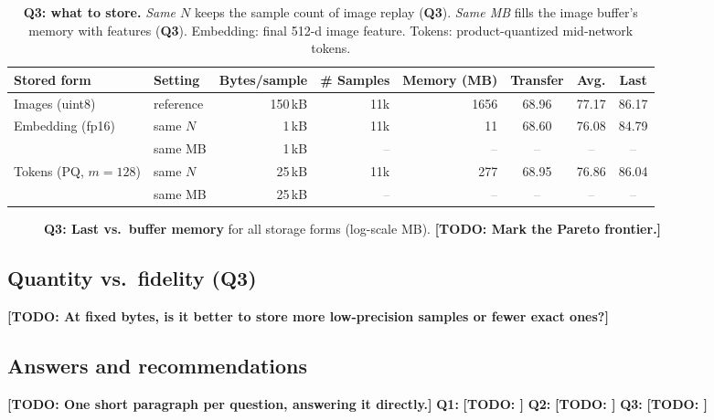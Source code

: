 \documentclass[10pt,twocolumn,letterpaper]{article}
\newcommand{\TODO}[1]{\textbf{\color{red}[TODO: #1]}}
\newcommand{\Q}[1]{\textbf{Q#1}\xspace}     %
\newcommand{\tbd}{\textcolor{gray}{--}}          %
\begin{document}
\begin{table}[t]
\centering
\small
\caption{\textbf{\Q{3}: what to store.} \emph{Same $N$} keeps the
sample count of image replay (\Q{3}). \emph{Same MB} fills the image buffer's
memory with features (\Q{3}). Embedding: final 512-d image feature.
Tokens: product-quantized mid-network tokens.}
\label{tab:q3ab}
\begin{tabular}{@{}ll rrr ccc@{}}
\toprule
Stored form & Setting & Bytes/sample & \# Samples & Memory (MB)
            & Transfer & Avg. & Last \\
\midrule
Images (uint8)       & reference & 150\,kB & 11k  & 1656 & 68.96 & 77.17 & 86.17 \\
\midrule
\multirow{2}{*}{Embedding (fp16)}
                     & same $N$  & 1\,kB   & 11k  & 11   & 68.60 & 76.08 & 84.79 \\
                     & same MB   & 1\,kB   & \tbd & \tbd & \tbd & \tbd & \tbd \\
\midrule
\multirow{2}{*}{Tokens (PQ, $m{=}128$)}
                     & same $N$  & 25\,kB  & 11k  & 277  & 68.95 & 76.86 & 86.04 \\
                     & same MB   & 25\,kB  & \tbd & \tbd & \tbd & \tbd & \tbd \\
\bottomrule
\end{tabular}
\end{table}

\begin{figure}[t]
  \centering
  \fbox{\rule{0pt}{1.2in}\rule{0.9\linewidth}{0pt}}
  \caption{\textbf{\Q{3}: Last vs.\ buffer memory} for all storage forms (log-scale MB). \TODO{Mark the Pareto frontier.}}
  \label{fig:pareto}
\end{figure}

\subsection{Quantity vs.\ fidelity (\Q{3})}
\label{sec:disc-q3d}
\TODO{At fixed bytes, is it better to store more low-precision samples or fewer exact ones?}

\subsection{Answers and recommendations}
\label{sec:answers}
\TODO{One short paragraph per question, answering it directly.}
\textbf{\Q{1}:} \TODO{}
\textbf{\Q{2}:} \TODO{}
\textbf{\Q{3}:} \TODO{}
\end{document}
